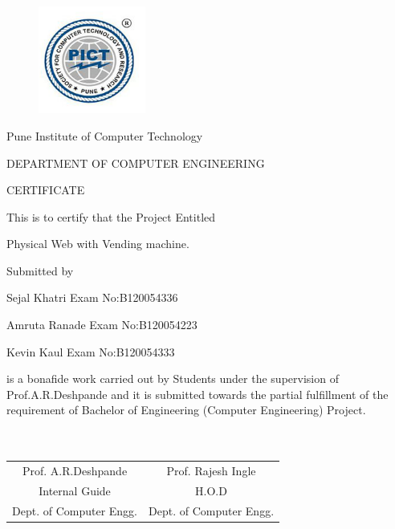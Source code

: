 \documentclass[oneside,a4paper,12pt]{report}
\begin{document}
\newpage



\begin{figure}[ht]
\centering
\includegraphics[width=100pt]{collegelogo.png}
\end{figure}


{\bfseries \fontsize{14}{12} \selectfont \centerline{Pune Institute of Computer Technology}
\centerline{DEPARTMENT OF COMPUTER ENGINEERING}
\vspace*{3\baselineskip}} 


{\bfseries \fontsize{16}{12} \selectfont \centerline{CERTIFICATE} 
\vspace*{3\baselineskip}} 

\centerline{This is to certify that the Project Entitled}
\vspace*{1\baselineskip} 


{\bfseries \fontsize{14}{12} \selectfont \centerline{ Physical Web with Vending machine.}
\vspace*{1\baselineskip}}

\centerline{Submitted by}
\vspace*{1\baselineskip} 
\centerline{Sejal Khatri  \hspace{25 mm} Exam No:B120054336} 
\centerline{Amruta Ranade \hspace{25 mm} Exam No:B120054223  } 
\centerline{Kevin Kaul \hspace{25 mm} Exam No:B120054333 }
\vspace*{1\baselineskip} 
is a bonafide work carried out by Students under the supervision of Prof.A.R.Deshpande and it
is submitted towards the partial fulfillment of the requirement of Bachelor of Engineering (Computer Engineering) Project.\\\\\\

\bgroup
\def\arraystretch{0.7}
\begin{tabular}{c c }
Prof. A.R.Deshpande &  \hspace{50 mm} Prof. Rajesh Ingle \\								
Internal Guide   &  \hspace{50 mm} H.O.D \\
Dept. of Computer Engg.  &	\hspace{50 mm}Dept. of Computer Engg.  \\
\end{tabular}
\end{document}
